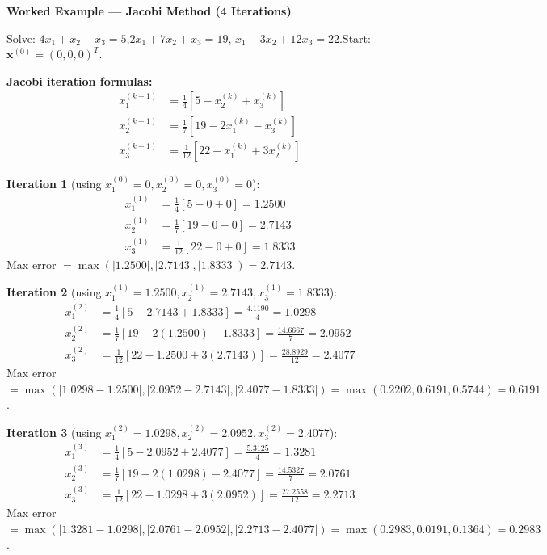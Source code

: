 \documentclass[12pt,a4paper]{article}
\begin{document}
\textbf{Worked Example --- Jacobi Method (4 Iterations)}

Solve: \(4x_1 + x_2 - x_3 = 5\),\quad \(2x_1 + 7x_2 + x_3 = 19\),\quad
\(x_1 - 3x_2 + 12x_3 = 22\).\quad Start: \(\mathbf{x}^{(0)} = (0,0,0)^T\).

\textbf{Jacobi iteration formulas:}
\begin{align*}
x_1^{(k+1)} &= \tfrac{1}{4}\!\left[5 - x_2^{(k)} + x_3^{(k)}\right] \\
x_2^{(k+1)} &= \tfrac{1}{7}\!\left[19 - 2x_1^{(k)} - x_3^{(k)}\right] \\
x_3^{(k+1)} &= \tfrac{1}{12}\!\left[22 - x_1^{(k)} + 3x_2^{(k)}\right]
\end{align*}

\textbf{Iteration 1} (using \(x_1^{(0)}=0, x_2^{(0)}=0, x_3^{(0)}=0\)):
\begin{align*}
x_1^{(1)} &= \tfrac{1}{4}[5 - 0 + 0] = 1.2500 \\
x_2^{(1)} &= \tfrac{1}{7}[19 - 0 - 0] = 2.7143 \\
x_3^{(1)} &= \tfrac{1}{12}[22 - 0 + 0] = 1.8333
\end{align*}
Max error \(= \max(|1.2500|, |2.7143|, |1.8333|) = 2.7143\).

\textbf{Iteration 2} (using \(x_1^{(1)}=1.2500, x_2^{(1)}=2.7143, x_3^{(1)}=1.8333\)):
\begin{align*}
x_1^{(2)} &= \tfrac{1}{4}[5 - 2.7143 + 1.8333] = \tfrac{4.1190}{4} = 1.0298 \\
x_2^{(2)} &= \tfrac{1}{7}[19 - 2(1.2500) - 1.8333] = \tfrac{14.6667}{7} = 2.0952 \\
x_3^{(2)} &= \tfrac{1}{12}[22 - 1.2500 + 3(2.7143)] = \tfrac{28.8929}{12} = 2.4077
\end{align*}
Max error \(= \max(|1.0298-1.2500|, |2.0952-2.7143|, |2.4077-1.8333|)
= \max(0.2202, 0.6191, 0.5744) = 0.6191\).

\textbf{Iteration 3} (using \(x_1^{(2)}=1.0298, x_2^{(2)}=2.0952, x_3^{(2)}=2.4077\)):
\begin{align*}
x_1^{(3)} &= \tfrac{1}{4}[5 - 2.0952 + 2.4077] = \tfrac{5.3125}{4} = 1.3281 \\
x_2^{(3)} &= \tfrac{1}{7}[19 - 2(1.0298) - 2.4077] = \tfrac{14.5327}{7} = 2.0761 \\
x_3^{(3)} &= \tfrac{1}{12}[22 - 1.0298 + 3(2.0952)] = \tfrac{27.2558}{12} = 2.2713
\end{align*}
Max error \(= \max(|1.3281-1.0298|,|2.0761-2.0952|,|2.2713-2.4077|)
= \max(0.2983, 0.0191, 0.1364) = 0.2983\).
\end{document}
